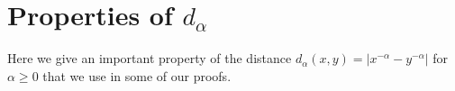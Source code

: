 \documentclass[11pt,a4paper]{article}
\newcommand{\RR}{\mathbb{R}}
\newcommand{\RRP}{\mathbb{R}^+_*}
\newtheorem{lemma}[theorem]{Lemma}
\begin{document}
\newpage
\section{Properties of $d_\alpha$}
Here we give an important property of the distance $d_\alpha(x,y) = |x^{-\alpha} - y^{-\alpha}|$ for $\alpha \geq 0$ that we use in some of our proofs.
    
\end{document}
